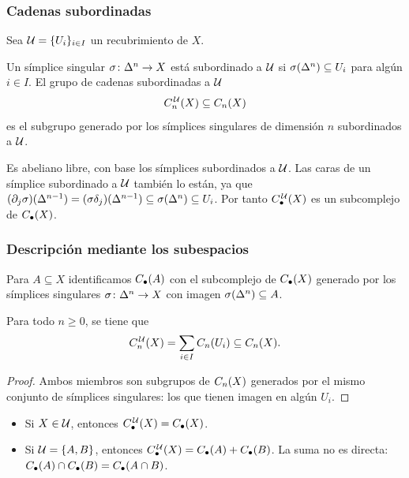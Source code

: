 \begin{frame}
  \frametitle{Cadenas subordinadas}

  Sea $\mathcal{U}=\{U_i\}_{i\in I}$ un recubrimiento de $X$.

  \begin{definition}
    Un símplice singular $\sigma\colon\Delta^{n}\to X$ está
    \alert{subordinado} a $\mathcal{U}$ si $\sigma(\Delta^{n})\subseteq U_i$ para
    algún $i\in I$. El grupo de \alert{cadenas subordinadas} a $\mathcal{U}$
    \[
      C^{\mkern2mu\mathcal{U}}_n(X)\subseteq C_n(X)
    \]
    es el subgrupo generado por los símplices singulares de dimensión $n$
    subordinados a $\mathcal{U}$.
  \end{definition}

  Es abeliano libre, con base los símplices subordinados a $\mathcal{U}$. Las caras
  de un símplice subordinado a $\mathcal{U}$ también lo están, ya que
  $(\partial_j\sigma)(\Delta^{n-1})=(\sigma\delta_j)(\Delta^{n-1})\subseteq\sigma(\Delta^{n})\subseteq U_i$.
  Por tanto 
  $C^{\mkern2mu\mathcal{U}}_\bullet(X)$ es un \alert{subcomplejo} de $C_\bullet(X)$.
\end{frame}

\begin{frame}[allowframebreaks]
  \frametitle{Descripción mediante los subespacios}

  Para $A\subseteq X$ identificamos $C_\bullet(A)$ con el subcomplejo de
  $C_\bullet(X)$ generado por los símplices singulares $\sigma\colon\Delta^{n}\to X$ con imagen $\sigma(\Delta^{n})\subseteq A$.

  \begin{proposition}
    Para todo $n\geq0$, se tiene que
    \[
      C^{\mkern2mu\mathcal{U}}_n(X)=\sum_{i\in I}C_n(U_i)\subseteq C_n(X).
    \]
  \end{proposition}

  \begin{proof}
    Ambos miembros son subgrupos de $C_n(X)$ generados por el mismo
    conjunto de símplices singulares: los que tienen imagen en algún $U_i$.
  \end{proof}

  \framebreak

  \begin{example}
    \begin{itemize}
      \item Si $X\in\mathcal{U}$, entonces $C^{\mkern2mu\mathcal{U}}_\bullet(X)=C_\bullet(X)$.
      \item Si $\mathcal{U}=\{A,B\}$, entonces
        $C^{\mkern2mu\mathcal{U}}_\bullet(X)=C_\bullet(A)+C_\bullet(B)$. La suma no es
        directa: $C_\bullet(A)\cap C_\bullet(B)=C_\bullet(A\cap B)$.
    \end{itemize}
  \end{example}
\end{frame}

